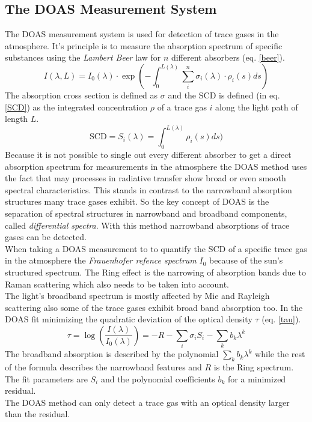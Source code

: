 \documentclass[12pt, english]{scrartcl} %
\begin{document}
\begin{multicols}{2}
 \subsection{The DOAS Measurement System}
The DOAS measurement system is used for detection of trace gases in the atmosphere. It's principle is to measure the absorption spectrum of specific substances using the \textit{Lambert Beer} law for $n$ different absorbers (eq. \ref{beer}).
\begin{equation}\label{beer}
I(\lambda, L) = I_0(\lambda) \cdot \exp (- \int^{L(\lambda)}_0 \sum_i^n \sigma_i(\lambda) \cdot \rho_i(s) ds)
\end{equation}
The absorption cross section is defined as $\sigma$ and the SCD is defined (in eq. \ref{SCD}) as the integrated concentration $\rho$ of a trace gas $i$ along the light path of length $L$.
\begin{equation}\label{SCD}
\text{SCD} = S_i(\lambda) =\int^{L(\lambda)}_0  \rho_i(s) ds)
\end{equation}
Because it is not possible to single out every different absorber to get a direct absorption spectrum for measurements in the atmosphere the DOAS method uses the fact that may processes in radiative transfer show broad or even smooth spectral characteristics. This stands in contrast to the narrowband absorption structures many trace gases exhibit. So the key concept of DOAS is the separation of spectral structures in narrowband and broadband components, called \textit{differential spectra}. With this method narrowband absorptions of trace gases can be detected.\\
When taking a DOAS measurement to to quantify the SCD of a specific trace gas in the atmosphere the \textit{Frauenhofer refence spectrum} $I_0$ because of the sun's structured spectrum. The Ring effect is the narrowing of absorption bands due to Raman scattering which also needs to be taken into account.\\
The light's broadband spectrum is mostly affected by Mie and Rayleigh scattering also some of the trace gases exhibit broad band absorption too. In the DOAS fit minimizing the quadratic deviation of the optical density $\tau$ (eq. \ref{tau}).
\begin{equation}\label{tau}
\tau = \log (\frac{I(\lambda)}{I_0(\lambda) }) = -R -\sum_i \sigma_i S_i - \sum_k b_k \lambda^k
\end{equation}
The broadband absorption is described by the polynomial $\sum_k b_k \lambda^k$ while the rest of the formula describes the narrowband features and $R$ is the Ring spectrum. The fit parameters are $S_i$ and the polynomial coefficients $b_k$ for a minimized residual.\\
The DOAS method can only detect a trace gas with an optical density larger than the residual.

\end{multicols}
\end{document}

